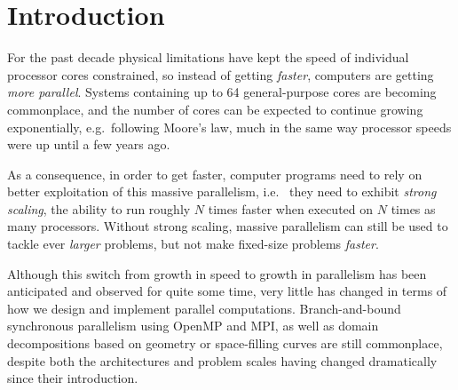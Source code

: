\documentclass{sig-alternate-05-2015}
\newcommand{\qs}{{\sc QuickSched}\xspace}
\begin{document}
\begin{abstract}
  
  
\end{abstract}





\section{Introduction}

For the past decade physical limitations have kept the speed of
individual processor cores constrained, so instead of getting {\em
  faster}, computers are getting {\em more parallel}.  Systems
containing up to 64 general-purpose cores are becoming commonplace,
and the number of cores can be expected to continue growing
exponentially, e.g.~following Moore's law, much in the same way
processor speeds were up until a few years ago.

As a consequence, in order to get faster, computer programs need to
rely on better exploitation of this massive parallelism, i.e.~ they
need to exhibit {\em strong scaling}, the ability to run roughly $N$
times faster when executed on $N$ times as many processors.  Without
strong scaling, massive parallelism can still be used to tackle ever
{\em larger} problems, but not make fixed-size problems {\em faster}.

Although this switch from growth in speed to growth in parallelism
has been anticipated and observed for quite some time, very little
has changed in terms of how we design and implement parallel
computations.
Branch-and-bound synchronous parallelism using
OpenMP\cite{ref:Dagum1998} and MPI\cite{ref:Snir1998}, as well as domain
decompositions based on geometry or space-filling curves \cite{warren1993parallel}
are still commonplace, despite both the
architectures and problem scales having changed dramatically since
their introduction.
\end{document}
